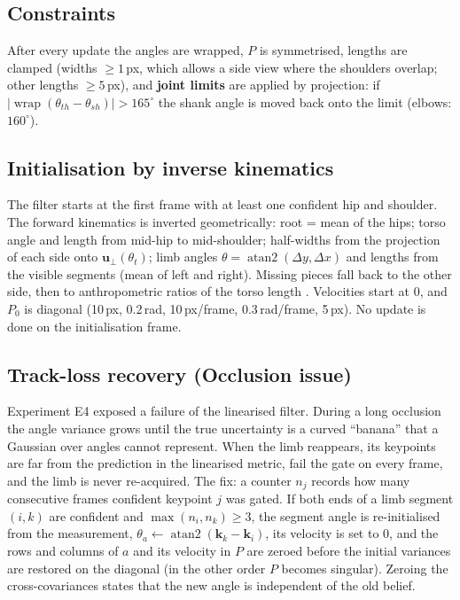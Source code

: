 \documentclass[12pt,a4paper]{article}
\newcommand{\wrapop}{\operatorname{wrap}}
\begin{document}
\subsection{Constraints}

After every update the angles are wrapped, $P$ is symmetrised, lengths are clamped (widths
$\ge 1$\,px, which allows a side view where the shoulders overlap; other lengths $\ge 5$\,px), and
\textbf{joint limits} are applied by projection: if $|\wrapop(\theta_{th}-\theta_{sh})| > 165^\circ$
the shank angle is moved back onto the limit (elbows: $160^\circ$).

\subsection{Initialisation by inverse kinematics}

The filter starts at the first frame with at least one confident hip and shoulder. The forward kinematics
is inverted geometrically: root = mean of the hips; torso angle and length from mid-hip to mid-shoulder;
half-widths from the projection of each side onto $\mathbf{u}_\perp(\theta_t)$; limb angles
$\theta=\operatorname{atan2}(\Delta y,\Delta x)$ and lengths from the visible segments (mean of left and
right). Missing pieces fall back to the other side, then to anthropometric ratios of the torso length
\cite{winter}. Velocities start at 0, and $P_0$ is diagonal (10\,px, 0.2\,rad, 10\,px/frame, 0.3\,rad/frame,
5\,px). No update is done on the initialisation frame.

\subsection{Track-loss recovery (Occlusion issue)}
\label{sec:reinit}

Experiment E4 exposed a failure of the linearised filter. During a long occlusion the angle variance grows
until the true uncertainty is a curved ``banana'' that a Gaussian over angles cannot represent. When the
limb reappears, its keypoints are far from the prediction in the linearised metric, fail the gate on every
frame, and the limb is never re-acquired. The fix: a counter $n_j$ records how many consecutive frames
confident keypoint $j$ was gated. If both ends of a limb segment $(i,k)$ are confident and
$\max(n_i,n_k)\ge 3$, the segment angle is re-initialised from the measurement,
$\theta_a\leftarrow\operatorname{atan2}(\mathbf{k}_k-\mathbf{k}_i)$, its velocity is set to 0, and the rows
and columns of $a$ and its velocity in $P$ are zeroed before the initial variances are restored on the
diagonal (in the other order $P$ becomes singular). Zeroing the cross-covariances states that the new angle
is independent of the old belief.
\end{document}
